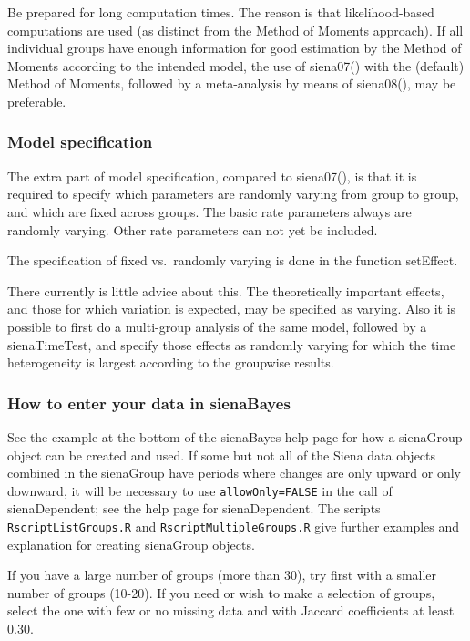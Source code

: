 \documentclass[a4paper,fleqn,11pt]{article}
\newcommand{\+}{\, + \,}
\newcommand{\sfn}[1]{\textsf{#1}}
\begin{document}
Be prepared for long computation times. The reason is that likelihood-based 
computations are used (as distinct from the Method of Moments approach). 
If all individual groups have enough information for good estimation by 
the Method of Moments according to the intended model, 
the use of \sfn{siena07()} with the (default) Method of Moments, followed by a 
meta-analysis by means of \sfn{siena08()}, may be preferable.

\subsubsection{Model specification}

The extra part of model specification, compared to \sfn{siena07()},
is that it is required to specify which parameters are
randomly varying from group to group, and which are fixed across groups.
The basic rate parameters always are randomly varying. 
Other rate parameters can not yet be included.

The specification of fixed vs.\ randomly varying is done in the function \sfn{setEffect}.

There currently is little advice about this.
The theoretically important effects, and those for which variation is expected, 
may be specified as varying.
Also it is possible to first do a multi-group analysis of the same model, 
followed by a \sfn{sienaTimeTest}, and specify those effects as randomly 
varying for which the time heterogeneity is largest according to the groupwise results.

\subsubsection{How to enter your data in sienaBayes}

See the example at the bottom of the \sfn{sienaBayes} help page for how a 
\sfn{sienaGroup} object can be created and used.
If some but not all of the Siena data objects combined in the \sfn{sienaGroup} have 
periods where changes are only upward or only downward, 
it will be necessary to use \texttt{allowOnly=FALSE} in the call of 
\sfn{sienaDependent}; see the help page for \sfn{sienaDependent}.
The scripts \texttt{RscriptListGroups.R} and \texttt{RscriptMultipleGroups.R} 
give further examples and explanation for creating \sfn{sienaGroup} objects.

If you have a large number of groups (more than 30), try first 
with a smaller number of groups (10-20). If you need or wish to 
make a selection of groups, select the one with few or no missing data and 
with Jaccard coefficients at least 0.30.
\end{document}
